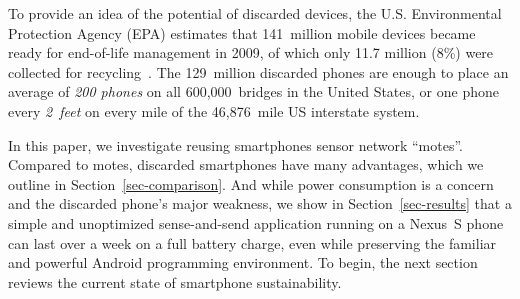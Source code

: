 To provide an idea of the potential of discarded devices, the U.S.
Environmental Protection Agency (EPA) estimates that 141~million mobile
devices became ready for end-of-life management in 2009, of which only 11.7
million (8\%) were collected for recycling~\cite{epa-ewasteweb}. The
129~million discarded phones are enough to place an average of \textit{200
phones} on all 600,000~bridges in the United States, or one phone every
\textit{2~feet} on every mile of the 46,876~mile US interstate system.

In this paper, we investigate reusing smartphones sensor network ``motes''.
Compared to motes, discarded smartphones have many advantages, which we
outline in Section~\ref{sec-comparison}. And while power consumption is a
concern and the discarded phone's major weakness, we show in
Section~\ref{sec-results} that a simple and unoptimized sense-and-send
application running on a Nexus~S phone can last over a week on a full battery
charge, even while preserving the familiar and powerful Android programming
environment. To begin, the next section reviews the current state of
smartphone sustainability.
